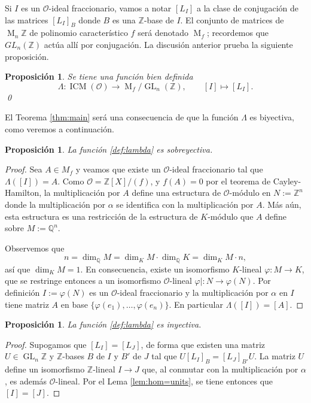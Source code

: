 \documentclass[11pt,a4paper]{amsart}
\newcommand{\Q}{\mathbb{Q}}
\newcommand{\Z}{\mathbb{Z}}
\DeclareMathOperator{\ICM}{ICM}
\DeclareMathOperator{\M}{M}
\DeclareMathOperator{\GL}{GL}
\numberwithin{equation}{section}
\theoremstyle{plain}
\newtheorem{prop}[equation]{Proposición}
\renewcommand{\O}{\mathcal{O}}
\begin{document}
Si $I$ es un $\O$-ideal fraccionario,
vamos a notar $[L_I]$ a la clase de conjugación de las matrices $[L_I]_B$
donde $B$ es una $\Z$-base de $I$. El conjunto de matrices de $\M_n \Z$
de polinomio característico $f$ será denotado $\M_f$; recordemos que
$GL_n(\Z)$ actúa allí por conjugación.
La discusión anterior prueba la siguiente proposición.

\begin{prop} Se tiene una función bien definida
\begin{equation}\label{def:lambda}
\Lambda \colon \ICM(\O) \to \M_f/\GL_n(\Z), \qquad [I] \mapsto [L_I].
\end{equation}
\qed
\end{prop}

El Teorema \ref{thm:main} será una consecuencia de que la función $\Lambda$
es biyectiva, como veremos a continuación.

\begin{prop} La función \eqref{def:lambda} es sobreyectiva.
\end{prop}
\begin{proof} Sea $A \in M_f$ y veamos que existe un $\O$-ideal
fraccionario tal que $\Lambda([I]) = A$. Como $\O = \Z[X]/(f)$,
y $f(A) = 0$ por el teorema de Cayley-Hamilton,
la multiplicación por $A$ define una estructura de $\O$-módulo
en $N:= \Z^n$ donde la multiplicación por $\alpha$ se identifica con
la multiplicación por $A$. Más aún, esta estructura
es una restricción de la estructura
de $K$-módulo que $A$ define sobre $M := \Q^n$.

Observemos que
\[
n = \dim_{\Q} M = \dim_K M \cdot \dim_\Q K = \dim_K M \cdot n,
\]
así que $\dim_K M = 1$. En consecuencia, existe un isomorfismo
$K$-lineal $\varphi \colon M \to K$, que se restringe
entonces a un isomorfismo $\O$-lineal $\varphi| \colon N \to \varphi(N)$.
Por definición $I := \varphi(N)$ es un $\O$-ideal fraccionario y
la multiplicación por $\alpha$ en $I$ tiene matriz $A$ en base
$\{\varphi(e_1), \ldots, \varphi(e_n)\}$. En particular
$\Lambda([I]) = [A]$.
\end{proof}

\begin{prop} La función \eqref{def:lambda} es inyectiva. \label{prop:lambda-mono}
\end{prop}
\begin{proof} Supogamos que $[L_I] = [L_J]$, de forma que existen
una matriz $U \in \GL_n \Z$ y $\Z$-bases $B$ de $I$ y $B'$ de $J$
tal que $U [L_I]_{B} = [L_J]_{B'} U$. La matriz $U$ define
un isomorfismo $\Z$-lineal $I \to J$ que, al conmutar con la multiplicación
por $\alpha$, es además $\O$-lineal. Por el Lema \ref{lem:hom=units},
se tiene entonces que $[I] = [J]$.
\end{proof}
\end{document}
